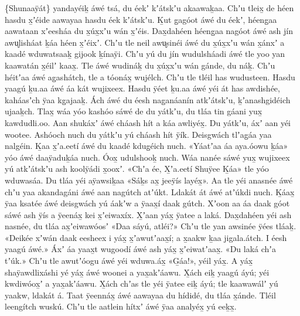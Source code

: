 \begin{pairs}
\begin{Leftside}
\{Shunaaÿát\} yandayéiḵ áwé tsá, du éekʼ kʼátskʼu akaawaḵaa.
Chʼu tleix̱ de héen hasdu x̱ʼéi\-de aawayaa hasdu éek kʼátskʼu.
Ḵut g̱agóot áwé du éekʼ, héeng̱aa aawataan xʼeesháa du x̱úx̱\-xʼu wán x̱ʼéis.
Dax̱dahéen héeng̱aa nagóot áwé ash jín awu̬lisháat ḵáa héen x̱ʼéixʼ.
Chʼu tle neil awu̬sinéi áwé du x̱úx̱xʼu wán x̱ánxʼ a kaadé wduwatsaaḵ gijook ḵínaÿi.
Chʼu yú du jín wudulsháadi áwé tle yoo yan kaawatán x̱éilʼ kaax̱.
Tle áwé wudináḵ du x̱úx̱xʼu wán gánde, du náḵ.
Chʼu héitʼaa áwé ag̱ashátch, tle a tóonáx̱ wujélch.
Chʼu tle tléil has wudusteen.
Hasdu yaagú ḵu.aa áwé áa kát wujixeex.
\pend
\pstart
{}Hasdu ÿéet ḵu.aa áwé yéi át has awdi\-shée, kaháasʼch ÿaa kg̱ajaaḵ.
Ách áwé du éesh nag̱a\-náanín atkʼátskʼu, ḵʼanashgidéich ujaaḵch.
Tlax̱ wáa yóo kashóo sáwé de du yátkʼu, du tláa tin gáani yux̱ kawdudli.oo.
Aan shukáxʼ áwé cháash hít a káa awliyéx̱.
Du yátkʼu, áxʼ aan yéi wootee.
Ashóoch nuch du yátkʼu yú cháash hít ÿík.
Deisgwách tlʼag̱áa yaa nalgéin.
Ḵaa x̱ʼa.eetí áwé du kaadé kdug̱éich nuch.
«\!Yáatʼaa áa aya.óowu ḵáa\!» yóo áwé daaÿaduḵáa nuch.
Óox̱ udulshooḵ nuch.
Wáa nanée sáwé yux̱ wujixeex yú atkʼátskʼu ash koolÿádi x̱ooxʼ.
«\!Chʼa ée, X̱ʼa.eetí Shuÿee Ḵáa\!» tle yóo wdu\-wasáa.
Du tláa yéi aÿawsiḵaa «\!Sáḵs ax̱ jee\-ÿís layéx̱\!».
Aa tle yéi anasnée áwé chʼu yaa akandagáni áwé aan nagútch atʼúkt.
Lda\-kát át áwé atʼúkdi nuch.
Ḵáax̱ ÿaa ksatée áwé deisgwách yú áakʼw a ÿaax̱í daak gútch.
\pend
\pstart
{}Xʼoon aa áa daak góot sáwé ash ÿís a ÿeenáx̱ kei x̱ʼeiwaxíx.
X̱ʼaan yáx̱ ÿatee a laká.
Dax̱dahéen yéi ash nasnée, du tláa ax̱ʼeiwawóosʼ
«\!Daa sáyú, atléi?\!»
Chʼu tle yan awsinée ÿées tláaḵ.
«\!Deikée xʼwán daak eesheex i yáx̱ x̱ʼawutʼaax̱í;
a x̱aakw ḵaa jigala.átch.
I éesh yaagú áwé.\!»
Áxʼ áa yaax̱t wugoodí áwé ash yáx̱ x̱ʼeiwatʼaax̱.
«\!Du laká chʼa tʼúk.\!»
Chʼu tle awutʼóogu áwé yéi wduwa.áx̱ «\!G̱áa!\!», yéil yáx̱.
A yáx̱ shaÿawdlixáshi yé yáx̱ áwé woonei a yax̱a\-kʼáawu.
X̱ách eiḵ yaagú áyú;
yéi kwdiwóox̱ʼ a yax̱akʼáawu.
X̱ách chʼas tle yéi ÿatee eiḵ áyú;
tle kaawawálʼ yú yaakw, ldakát á.
Taat ÿeennáx̱ áwé aawayaa du hídidé, du tláa x̱ánde.
Tléil leengítch wuskú.
\pend
\pstart
{}Chʼu tle aatlein hítxʼ áwé ÿaa analyéx̱ yú eeḵx̱.

\end{Leftside}
\end{pairs}
